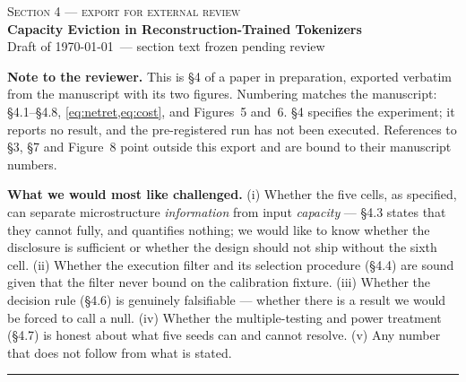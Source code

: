 \documentclass[10pt]{article}
\author{}
\date{}
\begin{document}
\makeatletter
{}
\makeatother

\setcounter{section}{3}   %
\setcounter{figure}{4}    %
\setcounter{equation}{0}
\setcounter{table}{0}

{\centering
{\normalsize\textsc{Section 4 --- export for external review}}\\[0.5em]
{\Large\bfseries Capacity Eviction in Reconstruction-Trained Tokenizers}\\[0.4em]
{\small\color{tolgrey} Draft of \today\ --- section text frozen pending review}\\[1.6em]
}

\noindent\textbf{Note to the reviewer.} This is \S4 of a paper in preparation, exported verbatim
from the manuscript with its two figures. Numbering matches the manuscript: \S4.1--\S4.8,
\cref{eq:netret,eq:cost}, and Figures~5 and~6. \S4 specifies the experiment; it reports no result,
and the pre-registered run has not been executed. References to \S3, \S7 and Figure~8 point
outside this export and are bound to their manuscript numbers.

\medskip
\noindent\textbf{What we would most like challenged.} (i) Whether the five cells, as specified,
can separate microstructure \emph{information} from input \emph{capacity} --- \S4.3 states that
they cannot fully, and quantifies nothing; we would like to know whether the disclosure is
sufficient or whether the design should not ship without the sixth cell. (ii) Whether the
execution filter and its selection procedure (\S4.4) are sound given that the filter never bound
on the calibration fixture. (iii) Whether the decision rule (\S4.6) is genuinely falsifiable ---
whether there is a result we would be forced to call a null. (iv) Whether the multiple-testing and
power treatment (\S4.7) is honest about what five seeds can and cannot resolve. (v) Any number
that does not follow from what is stated.

\bigskip
\hrule
\bigskip




\clearpage


\end{document}
